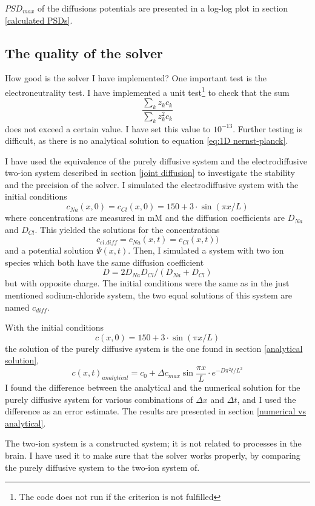 \documentclass{article}
\begin{document}
 
$PSD_{max}$ of the diffusions potentials are presented in a log-log plot in section \ref{calculated PSDs}. 

\subsection{The quality of the solver}
How good is the solver I have implemented? One important test is the electroneutrality test. I have implemented a unit test\footnote{The code does not run if the criterion is not fulfilled} to check that the sum 
$$\frac{\sum_k z_k c_k}{\sum_k z_k^2 c_k}$$
does not exceed a certain value. I have set this value to $10^{-13}$. Further testing is difficult, as there is no analytical solution to equation \ref{eq:1D nernst-planck}. 


I have used the equivalence of the purely diffusive system and the electrodiffusive two-ion system described in section \ref{joint diffusion} to investigate the stability and the precision of the solver. I simulated the electrodiffusive system with the initial conditions 
$$c_{Na}(x,0)=c_{Cl}(x,0)=150+3\cdot \sin(\pi x/L)$$
where concentrations are measured in mM and the diffusion coefficients are $D_{Na}$ and $D_{Cl}$. This yielded the solutions for the concentrations
$$c_{el.diff} =c_{Na}(x,t)=c_{Cl}(x,t))$$
and a potential solution $\Psi(x,t)$. Then, I simulated a system with two ion species which both have the same diffusion coefficient 
$$D=2D_{Na}D_{Cl}/(D_{Na}+D_{Cl})$$ 
but with opposite charge. The initial conditions were the same as in the just mentioned sodium-chloride system, the two equal solutions of this system are named $c_{diff}$.

With the initial conditions 
$$c(x,0)=150+3\cdot \sin(\pi x/L)$$
 the solution of the purely diffusive system is the one found in section \ref{analytical solution}, 
$$c(x,t)_{analytical} =c_0 + \Delta c_{max} \sin \frac{ \pi x}{L}\cdot e^{-D\pi^2 t /L^2}$$
I found the difference between the analytical and the numerical solution for the purely diffusive system for various combinations of $\Delta x$ and $\Delta t$, and I used the difference as an error estimate. The results are presented in section \ref{numerical vs analytical}. 

The two-ion system is a constructed system; it is not related to processes in the brain. I have used it to make sure that the solver works properly, by comparing the purely diffusive system to the two-ion system of. 
\end{document}
